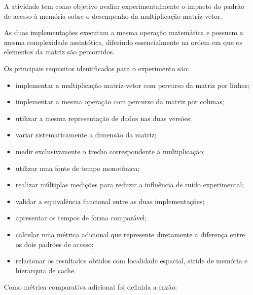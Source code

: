 \label{sec:atvd01-objetivos}

A atividade tem como objetivo avaliar experimentalmente o impacto do
padrão de acesso à memória sobre o desempenho da multiplicação
matriz-vetor.

As duas implementações executam a mesma operação matemática e possuem a
mesma complexidade assintótica, diferindo essencialmente na ordem em que
os elementos da matriz são percorridos.

Os principais requisitos identificados para o experimento são:

\begin{itemize}

    \item implementar a multiplicação matriz-vetor com percurso da matriz
    por linhas;

    \item implementar a mesma operação com percurso da matriz por colunas;

    \item utilizar a mesma representação de dados nas duas versões;

    \item variar sistematicamente a dimensão da matriz;

    \item medir exclusivamente o trecho correspondente à multiplicação;

    \item utilizar uma fonte de tempo monotônica;

    \item realizar múltiplas medições para reduzir a influência de ruído
    experimental;

    \item validar a equivalência funcional entre as duas implementações;

    \item apresentar os tempos de forma comparável;

    \item calcular uma métrica adicional que represente diretamente a
    diferença entre os dois padrões de acesso;

    \item relacionar os resultados obtidos com localidade espacial,
    stride de memória e hierarquia de cache.

\end{itemize}

Como métrica comparativa adicional foi definida a razão:


